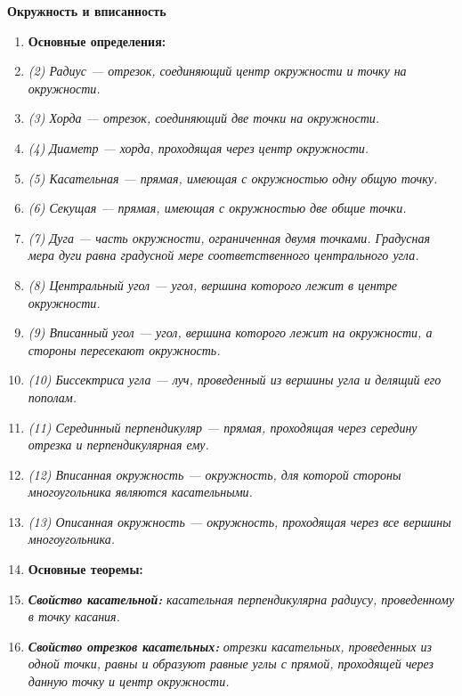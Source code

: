 \documentclass{article}
\begin{document}
\large


\begin{center}\Large
 \textbf{Окружность и вписанность}
\end{center}


\begin{enumerate}[label*=\protect\fbox{\arabic{enumi}}]

 \item []  {\bf Основные определения:}\large
 
 \item [] \textit{(2) Радиус --- отрезок, соединяющий центр окружности и точку на окружности.}
 \item [] \textit{(3) Хорда --- отрезок, соединяющий две точки на окружности.}
 \item [] \textit{(4) Диаметр --- хорда, проходящая через центр окружности.}
 \item [] \textit{(5) Касательная --- прямая, имеющая с окружностью одну общую точку.}
 \item [] \textit{(6) Секущая --- прямая, имеющая с окружностью две общие точки.}
 \item [] \textit{(7) Дуга --- часть окружности, ограниченная двумя точками. Градусная мера дуги равна градусной мере соответственного центрального угла.}
 \item [] \textit{(8) Центральный угол --- угол, вершина которого лежит в центре окружности.}
 \item [] \textit{(9) Вписанный угол --- угол, вершина которого лежит на окружности, а стороны пересекают окружность.}
 \item [] \textit{(10) Биссектриса угла --- луч, проведенный из вершины угла и делящий его пополам.}
 \item [] \textit{(11) Серединный перпендикуляр --- прямая, проходящая через середину отрезка и перпендикулярная ему.}
 \item [] \textit{(12) Вписанная окружность --- окружность, для которой стороны многоугольника являются касательными.}
 \item [] \textit{(13) Описанная окружность --- окружность, проходящая через все вершины многоугольника.}
 \item []  {\bf Основные теоремы:}\large
 \item [] \textbf{\textit{Свойство касательной:}} \textit{касательная перпендикулярна радиусу, проведенному в точку касания.}
 \item [] \textbf{\textit{Свойство отрезков касательных:}} \textit{отрезки касательных, проведенных из одной точки, равны и образуют равные углы с прямой, проходящей через данную точку и центр окружности.}

\end{enumerate}
\end{document}
